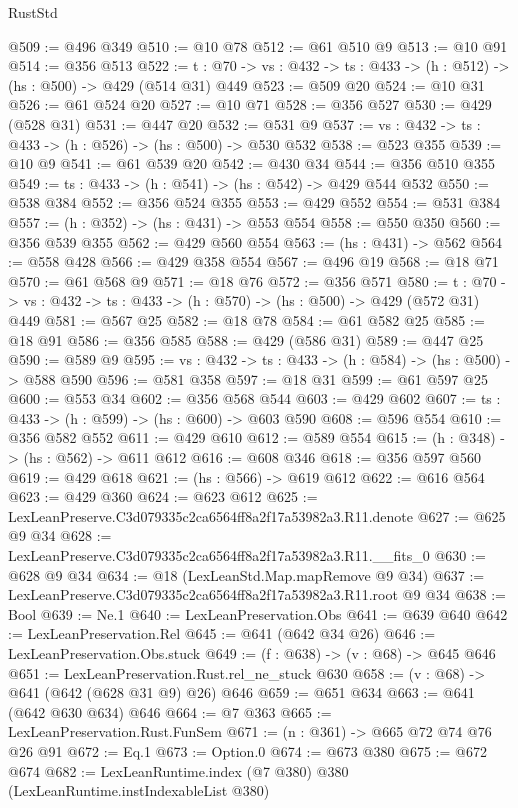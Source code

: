 \begin{lexlean}{RustStd}
\begin{coremodule}
@509 := @496 @349
@510 := @10 @78
@512 := @61 @510 @9
@513 := @10 @91
@514 := @356 @513
@522 := {t : @70} -> {vs : @432} -> {ts : @433} -> (h : @512) -> (hs : @500) -> @429 (@514 @31) @449
@523 := @509 @20
@524 := @10 @31
@526 := @61 @524 @20
@527 := @10 @71
@528 := @356 @527
@530 := @429 (@528 @31)
@531 := @447 @20
@532 := @531 @9
@537 := {vs : @432} -> {ts : @433} -> (h : @526) -> (hs : @500) -> @530 @532
@538 := @523 @355
@539 := @10 @9
@541 := @61 @539 @20
@542 := @430 @34
@544 := @356 @510 @355
@549 := {ts : @433} -> (h : @541) -> (hs : @542) -> @429 @544 @532
@550 := @538 @384
@552 := @356 @524 @355
@553 := @429 @552
@554 := @531 @384
@557 := (h : @352) -> (hs : @431) -> @553 @554
@558 := @550 @350
@560 := @356 @539 @355
@562 := @429 @560 @554
@563 := (hs : @431) -> @562
@564 := @558 @428
@566 := @429 @358 @554
@567 := @496 @19
@568 := @18 @71
@570 := @61 @568 @9
@571 := @18 @76
@572 := @356 @571
@580 := {t : @70} -> {vs : @432} -> {ts : @433} -> (h : @570) -> (hs : @500) -> @429 (@572 @31) @449
@581 := @567 @25
@582 := @18 @78
@584 := @61 @582 @25
@585 := @18 @91
@586 := @356 @585
@588 := @429 (@586 @31)
@589 := @447 @25
@590 := @589 @9
@595 := {vs : @432} -> {ts : @433} -> (h : @584) -> (hs : @500) -> @588 @590
@596 := @581 @358
@597 := @18 @31
@599 := @61 @597 @25
@600 := @553 @34
@602 := @356 @568 @544
@603 := @429 @602
@607 := {ts : @433} -> (h : @599) -> (hs : @600) -> @603 @590
@608 := @596 @554
@610 := @356 @582 @552
@611 := @429 @610
@612 := @589 @554
@615 := (h : @348) -> (hs : @562) -> @611 @612
@616 := @608 @346
@618 := @356 @597 @560
@619 := @429 @618
@621 := (hs : @566) -> @619 @612
@622 := @616 @564
@623 := @429 @360
@624 := @623 @612
@625 := LexLeanPreserve.C3d079335c2ca6564ff8a2f17a53982a3.R11.denote
@627 := @625 @9 @34
@628 := LexLeanPreserve.C3d079335c2ca6564ff8a2f17a53982a3.R11.__fits_0
@630 := @628 @9 @34
@634 := @18 (LexLeanStd.Map.mapRemove @9 @34)
@637 := LexLeanPreserve.C3d079335c2ca6564ff8a2f17a53982a3.R11.root @9 @34
@638 := Bool
@639 := Ne.{1}
@640 := LexLeanPreservation.Obs
@641 := @639 @640
@642 := LexLeanPreservation.Rel
@645 := @641 (@642 @34 @26)
@646 := LexLeanPreservation.Obs.stuck
@649 := (f : @638) -> (v : @68) -> @645 @646
@651 := LexLeanPreservation.Rust.rel_ne_stuck @630
@658 := (v : @68) -> @641 (@642 (@628 @31 @9) @26) @646
@659 := @651 @634
@663 := @641 (@642 @630 @634) @646
@664 := @7 @363
@665 := LexLeanPreservation.Rust.FunSem
@671 := (n : @361) -> @665 @72 @74 @76 @26 @91
@672 := Eq.{1}
@673 := Option.{0}
@674 := @673 @380
@675 := @672 @674
@682 := LexLeanRuntime.index (@7 @380) @380 (LexLeanRuntime.instIndexableList @380)

\end{coremodule}
\end{lexlean}
